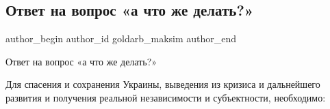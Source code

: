  
 
 
 
 
 
\subsection{Ответ на вопрос «а что же делать?»}
\label{sec:25_08_2021.fb.goldarb_maksim.1.chto_delat_otvet}
 
\ifcmt
 author_begin
   author_id goldarb_maksim
 author_end
\fi

Ответ на вопрос «а что же делать?»

Для спасения и сохранения Украины, выведения из кризиса и дальнейшего развития
и получения реальной независимости и субъектности, необходимо: 

